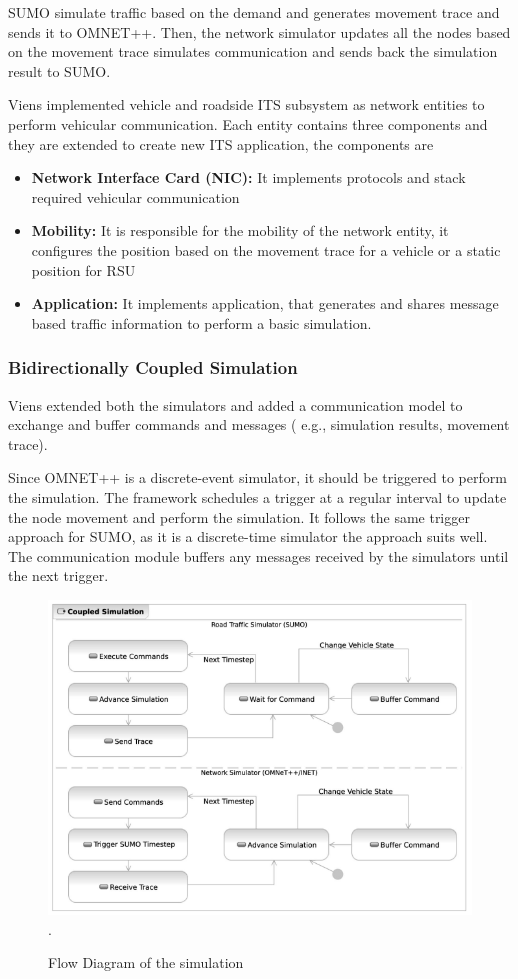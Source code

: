 SUMO simulate traffic based on the demand and generates movement trace and sends it to OMNET++. Then, the network simulator updates all the nodes based on the movement trace simulates communication and sends back the simulation result to SUMO.

Viens implemented vehicle and roadside ITS subsystem as network entities to perform vehicular communication. Each entity contains three components and they are extended to create new ITS application, the components are
\begin{itemize}
    \item \textbf{Network Interface Card (NIC): } It implements protocols and stack required vehicular communication
    \item \textbf{Mobility: } It is responsible for the mobility of the network entity, it configures the position based on the movement trace for a vehicle or a static position for RSU 
    \item \textbf{Application: } It implements application, that generates and shares message based traffic information  to perform a basic simulation.
\end{itemize}

\subsubsection{Bidirectionally Coupled Simulation}
Viens extended both the simulators and added a communication model to exchange and buffer commands and messages ( e.g., simulation results, movement trace).  

Since OMNET++ is a discrete-event simulator, it should be triggered to perform the simulation. The framework schedules a trigger at a regular interval to update the node movement and perform the simulation. It follows the same trigger approach for SUMO, as it is a discrete-time simulator the approach suits well. The communication module buffers any messages received by the simulators until the next trigger. 


\begin{figure}[H]
    \centering
    \includegraphics[width=12cm]{Framework/Images/veins1.png}.
    \caption{ Flow Diagram of the simulation \cite{veins}}
    \label{v1}
\end{figure}

